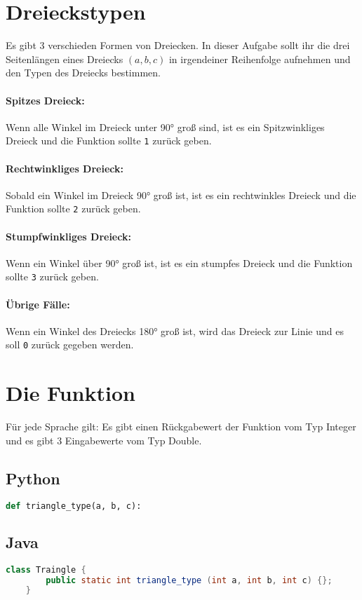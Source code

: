 \documentclass[a4paper]{article}
\author{Jochen Saalfeld}
\begin{document}
\section*{Dreieckstypen}
Es gibt 3 verschieden Formen von Dreiecken. In dieser Aufgabe sollt ihr die drei Seitenlängen eines Dreiecks $(a,b,c)$ in irgendeiner Reihenfolge aufnehmen und den Typen des Dreiecks bestimmen.
\paragraph{Spitzes Dreieck:} Wenn alle Winkel im Dreieck unter 90° groß sind, ist es ein Spitzwinkliges Dreieck und die Funktion sollte \texttt{1} zurück geben.
\paragraph{Rechtwinkliges Dreieck:} Sobald ein Winkel im Dreieck 90° groß ist, ist es ein rechtwinkles Dreieck und die Funktion sollte \texttt{2} zurück geben.
\paragraph{Stumpfwinkliges Dreieck:} Wenn ein Winkel über 90° groß ist, ist es ein stumpfes Dreieck und die Funktion sollte \texttt{3} zurück geben.
\paragraph{Übrige Fälle:} Wenn ein Winkel des Dreiecks 180° groß ist, wird das Dreieck zur Linie und es soll \texttt{0} zurück gegeben werden.
\section*{Die Funktion}
Für jede Sprache gilt: Es gibt einen Rückgabewert der Funktion vom Typ Integer und es gibt 3 Eingabewerte vom Typ Double.
\subsection*{Python}
\begin{lstlisting}[language=Python]
	def triangle_type(a, b, c):
\end{lstlisting}
\subsection*{Java}
\begin{lstlisting}[language=Java]
	class Traingle {
		public static int triangle_type (int a, int b, int c) {};
	}
\end{lstlisting}
\end{document}
